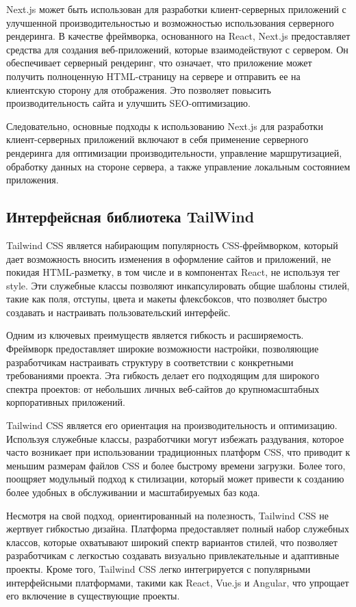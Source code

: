 \documentclass[master, och, diploma]{SCWorks}
\begin{document}
Next.js может быть использован для разработки клиент-серверных приложений с улучшенной производительностью и возможностью использования серверного рендеринга. В качестве фреймворка, основанного на React, Next.js предоставляет средства для создания веб-приложений, которые взаимодействуют с сервером. Он обеспечивает серверный рендеринг, что означает, что приложение может получить полноценную HTML-страницу на сервере и отправить ее на клиентскую сторону для отображения. Это позволяет повысить производительность сайта и улучшить SEO-оптимизацию.

Следовательно, основные подходы к использованию Next.js для разработки клиент-серверных приложений включают в себя применение серверного рендеринга для оптимизации производительности, управление маршрутизацией, обработку данных на стороне сервера, а также управление локальным состоянием приложения.



\subsection{Интерфейсная библиотека TailWind}
Tailwind CSS является набирающим популярность CSS-фреймворком, который дает возможность вносить изменения в оформление сайтов и приложений, не покидая HTML-разметку, в том числе и в компонентах React, не используя тег style. Эти служебные классы позволяют инкапсулировать общие шаблоны стилей, такие как поля, отступы, цвета и макеты флексбоксов, что позволяет быстро создавать и настраивать пользовательский интерфейс\cite{Tailwind}.

Одним из ключевых преимуществ является гибкость и расширяемость. Фреймворк предоставляет широкие возможности настройки, позволяющие разработчикам настраивать структуру в соответствии с конкретными требованиями проекта. Эта гибкость делает его подходящим для широкого спектра проектов: от небольших личных веб-сайтов до крупномасштабных корпоративных приложений.

Tailwind CSS является его ориентация на производительность и оптимизацию. Используя служебные классы, разработчики могут избежать раздувания, которое часто возникает при использовании традиционных платформ CSS, что приводит к меньшим размерам файлов CSS и более быстрому времени загрузки. Более того, поощряет модульный подход к стилизации, который может привести к созданию более удобных в обслуживании и масштабируемых баз кода.

Несмотря на свой подход, ориентированный на полезность, Tailwind CSS не жертвует гибкостью дизайна. Платформа предоставляет полный набор служебных классов, которые охватывают широкий спектр вариантов стилей, что позволяет разработчикам с легкостью создавать визуально привлекательные и адаптивные проекты. Кроме того, Tailwind CSS легко интегрируется с популярными интерфейсными платформами, такими как React, Vue.js и Angular, что упрощает его включение в существующие проекты\cite{Fain_2022}.
\end{document}
